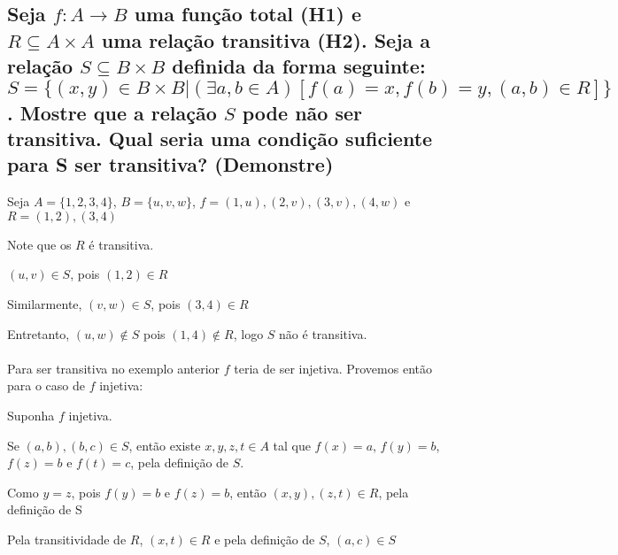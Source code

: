 \noindent
\subsection*{
	Seja 
	$ f \colon A \to B $ uma função total (H1) e $ R \subseteq A \times A $ uma relação transitiva (H2). Seja a relação $ S \subseteq B \times B $ definida da forma seguinte:	
	$ S = \{ (x,y) \in B \times B | (\exists a,b \in A)[f(a)=x, f(b)=y, (a,b) \in R ] \} $.
	Mostre que a relação $ S $ pode não ser transitiva.
	Qual seria uma condição suficiente para S ser transitiva? (Demonstre)
}


Seja $ A = \{ 1, 2, 3, 4 \} $, $ B = \{ u, v, w \} $, $ f = { (1,u), (2,v), (3,v), (4,w)} $ e $ R = {(1,2), (3,4)} $

Note que os $ R $ é transitiva.

$ (u,v) \in S $, pois $ (1,2) \in R $

Similarmente, $ (v,w) \in S $, pois $ (3,4) \in R $

Entretanto, $ (u,w) \notin S $ pois $(1,4) \notin R $, logo $ S $ não é transitiva.
\\~\\
Para ser transitiva no exemplo anterior $ f $ teria de ser injetiva. Provemos então para o caso de $ f $ injetiva: 

Suponha $ f $ injetiva. 

Se $ (a,b), (b,c) \in S $, então existe $ x, y, z, t \in A $ tal que $ f(x) = a $, $ f(y) = b $, $ f(z) = b $ e $ f(t) = c $, pela definição de $ S $. 

Como $ y = z $, pois $ f(y) = b $ e $ f(z) = b $, então $ (x,y), (z,t) \in R $, pela definição de S

Pela transitividade de $ R $, $ (x,t) \in R $ e pela definição de $ S $, $ (a,c) \in S $




